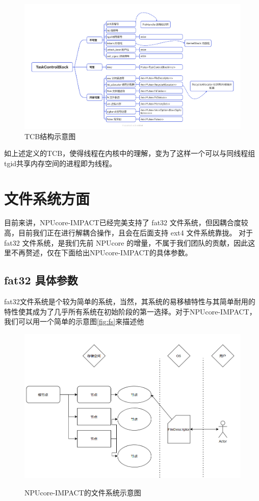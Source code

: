 \begin{figure}[h]
    \centering
    \includegraphics[width=1\linewidth]{figs/TCBBlock.png}
    \caption{TCB结构示意图}
    \label{TCB结构示意图}
\end{figure}

如上述定义的TCB，使得线程在内核中的理解，变为了这样一个可以与同线程组tgid共享内存空间的进程即为线程。

\section{文件系统方面}

目前来讲，NPUcore-IMPACT已经完美支持了 fat32 文件系统，但因耦合度较高，目前我们正在进行解耦合操作，且会在后面支持 ext4 文件系统靠拢。
对于 fat32 文件系统，是我们先前 NPUcore 的增量，不属于我们团队的贡献，因此这里不再赘述，仅在下面给出NPUcore-IMPACT的具体参数。

\subsection{fat32 具体参数}

fat32文件系统是个较为简单的系统，当然，其系统的易移植特性与其简单耐用的特性使其成为了几乎所有系统在初始阶段的第一选择。对于NPUcore-IMPACT，我们可以用一个简单的示意图\autoref{fig:fs}来描述他

\begin{figure}[htb]
    \centering
    \includegraphics[width=1\linewidth]{figs/dirt.PNG}
    \label{fig:fs}
    \caption{NPUcore-IMPACT的文件系统示意图}
\end{figure}

